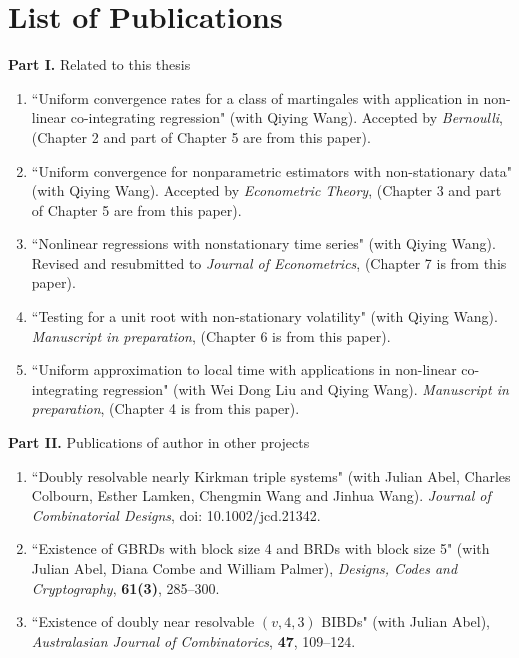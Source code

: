 \chapter{List of Publications}

{\bf Part I.} Related to this thesis
\begin{enumerate}
\item ``Uniform convergence rates for a class of martingales with application in non-linear co-integrating regression" (with Qiying Wang). Accepted by {\it Bernoulli}, (Chapter 2 and part of Chapter 5 are from this paper).
\item ``Uniform convergence for nonparametric estimators with non-stationary data" (with Qiying Wang). Accepted by {\it Econometric Theory}, (Chapter 3 and part of Chapter 5 are from this paper).
\item ``Nonlinear regressions with nonstationary time series" (with Qiying Wang). Revised and resubmitted to {\it Journal of Econometrics}, (Chapter 7 is from this paper).
\item ``Testing for a unit root with non-stationary volatility" (with Qiying Wang). {\it Manuscript in preparation}, (Chapter 6 is from this paper).
\item ``Uniform approximation to local time with applications in non-linear co-integrating regression" (with Wei Dong Liu and Qiying Wang). {\it Manuscript in preparation}, (Chapter 4 is from this paper).
\end{enumerate}

\medskip
\noindent
{\bf Part II.} Publications of author in other projects
\begin{enumerate}
\item ``Doubly resolvable nearly Kirkman triple systems" (with Julian Abel, Charles Colbourn, Esther Lamken, Chengmin Wang and Jinhua Wang). {\it Journal of Combinatorial Designs}, doi: 10.1002/jcd.21342.
\item ``Existence of GBRDs with block size 4 and BRDs with block size 5" (with Julian Abel, Diana Combe and William Palmer), {\it Designs, Codes and Cryptography}, {\bf 61(3)}, 285--300.
\item ``Existence of doubly near resolvable $(v, 4, 3)$ BIBDs" (with Julian Abel), {\it Australasian Journal of Combinatorics}, {\bf 47}, 109--124.
\end{enumerate}


